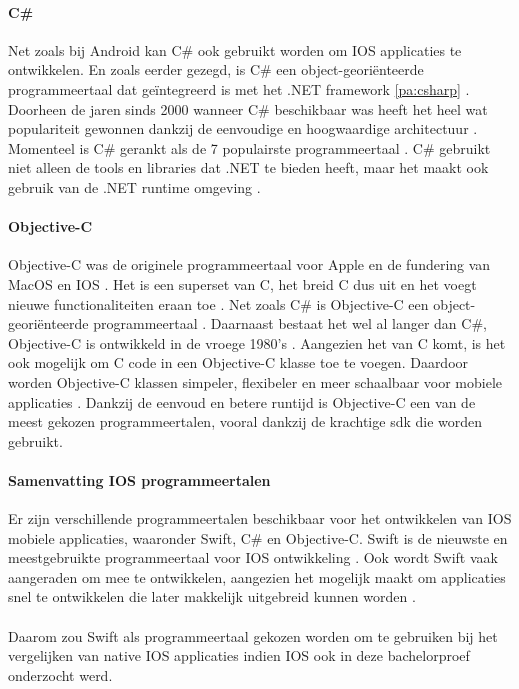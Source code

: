 \paragraph{C\#}
Net zoals bij Android kan C\# ook gebruikt worden om IOS applicaties te ontwikkelen. 
En zoals eerder gezegd, is C\# een object-georiënteerde programmeertaal dat geïntegreerd 
is met het .NET framework \ref{pa:csharp} \autocite{yuvraj2022}. Doorheen de jaren sinds 
2000 wanneer C\# beschikbaar was heeft het heel wat populariteit gewonnen dankzij de 
eenvoudige en hoogwaardige architectuur \autocite{yuvraj2022}. Momenteel is C\# gerankt 
als de 7 populairste programmeertaal \autocite{Johns2023}. C\# gebruikt niet alleen de 
tools en libraries dat .NET te bieden heeft, maar het maakt ook gebruik van de .NET runtime 
omgeving \autocite{Pruciak2022}.

\paragraph{Objective-C}
Objective-C was de originele programmeertaal voor Apple en de fundering van MacOS en 
IOS \autocite{Johns2023}. Het is een \gls{superset} van C, het breid C dus uit en het 
voegt nieuwe functionaliteiten eraan toe \autocite{Johns2023}. Net zoals C\# is Objective-C 
een object-georiënteerde programmeertaal \autocite{Pruciak2022}. Daarnaast bestaat 
het wel al langer dan C\#, Objective-C is ontwikkeld in de vroege 1980's \autocite{Pruciak2022}. 
Aangezien het van C komt, is het ook mogelijk om C code in een Objective-C klasse toe 
te voegen. Daardoor worden Objective-C klassen simpeler, flexibeler en meer schaalbaar 
voor mobiele applicaties \autocite{yuvraj2022}. Dankzij de eenvoud en betere runtijd is 
Objective-C een van de meest gekozen programmeertalen, vooral dankzij de krachtige \acrshort{sdk} 
die worden gebruikt.

\paragraph{Samenvatting IOS programmeertalen}
Er zijn verschillende programmeertalen beschikbaar voor het ontwikkelen van IOS 
mobiele applicaties, waaronder Swift, C\# en Objective-C. Swift is de nieuwste en 
meestgebruikte programmeertaal voor IOS ontwikkeling \autocite{yuvraj2022}. Ook 
wordt Swift vaak aangeraden om mee te ontwikkelen, aangezien het mogelijk maakt om 
applicaties snel te ontwikkelen die later makkelijk uitgebreid kunnen 
worden \autocite{Pruciak2022}. 
\\\\
Daarom zou Swift als programmeertaal gekozen worden om te gebruiken bij het vergelijken van 
native IOS applicaties indien IOS ook in deze bachelorproef onderzocht werd.

